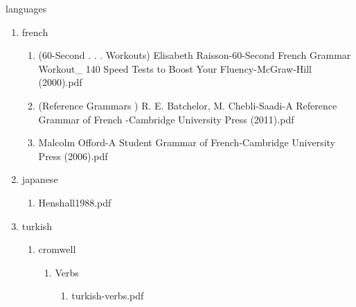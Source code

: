 \documentclass[11pt]{article}
\begin{document}
\item languages
\label{sec-1-1-1-1-27}
\begin{enumerate}
\item french
\label{sec-1-1-1-1-27-1}
\begin{enumerate}
\item (60-Second . . . Workouts) Elisabeth Raisson-60-Second French Grammar Workout\_ 140 Speed Tests to Boost Your Fluency-McGraw-Hill (2000).pdf
\label{sec-1-1-1-1-27-1-1}

\item (Reference Grammars ) R. E. Batchelor, M. Chebli-Saadi-A Reference Grammar of French  -Cambridge University Press (2011).pdf
\label{sec-1-1-1-1-27-1-2}

\item Malcolm Offord-A Student Grammar of French-Cambridge University Press (2006).pdf
\label{sec-1-1-1-1-27-1-3}
\end{enumerate}

\item japanese
\label{sec-1-1-1-1-27-2}
\begin{enumerate}
\item Henshall1988.pdf
\label{sec-1-1-1-1-27-2-1}
\end{enumerate}

\item turkish
\label{sec-1-1-1-1-27-3}
\begin{enumerate}
\item cromwell
\label{sec-1-1-1-1-27-3-1}
\begin{enumerate}
\item Verbs
\label{sec-1-1-1-1-27-3-1-1}
\begin{enumerate}
\item turkish-verbs.pdf
\label{sec-1-1-1-1-27-3-1-1-1}
\end{enumerate}
\end{enumerate}
\end{enumerate}
\end{enumerate}
\end{document}
